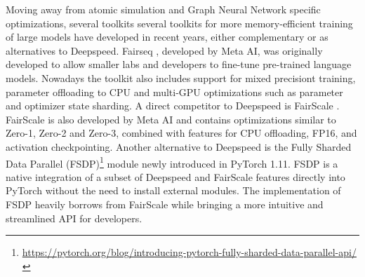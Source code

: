 Moving away from atomic simulation and Graph Neural Network specific optimizations, several 
toolkits several toolkits for more memory-efficient training of large models have developed 
in recent years, either complementary or as alternatives to Deepspeed. Fairseq \cite*{ott2019fairseq}, 
developed by Meta AI, was originally developed to allow smaller labs and developers to 
fine-tune pre-trained language models. Nowadays the toolkit also includes support for mixed 
precisiont training, parameter offloading to CPU and multi-GPU optimizations such as parameter and 
optimizer state sharding. A direct competitor to Deepspeed is FairScale \cite*{FairScale2021}. 
FairScale is also developed by Meta AI and contains optimizations similar to Zero-1, Zero-2 and 
Zero-3, combined with features for CPU offloading, FP16, and activation checkpointing. Another 
alternative to Deepspeed is the Fully Sharded Data Parallel (FSDP)\footnote{\url{https://pytorch.org/blog/introducing-pytorch-fully-sharded-data-parallel-api/}} 
module newly introduced in PyTorch 1.11. FSDP is a native integration of a subset of Deepspeed 
and FairScale features directly into PyTorch without the need to install external modules. 
The implementation of FSDP heavily borrows from FairScale while bringing a more intuitive and 
streamlined API for developers.


